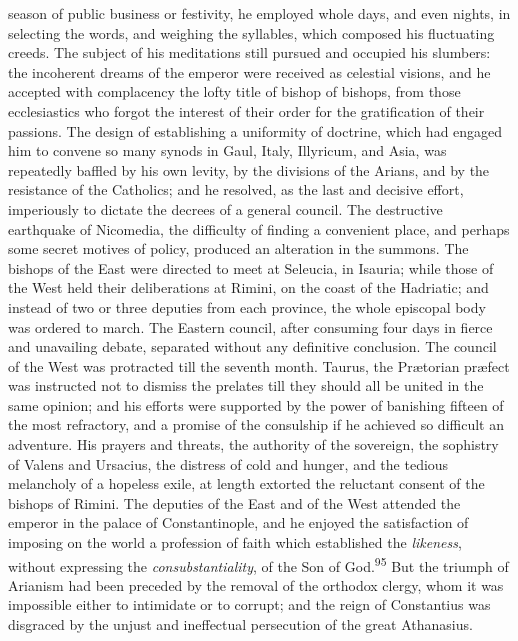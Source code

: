 season of public business or festivity, he employed whole days,
and even nights, in selecting the words, and weighing the
syllables, which composed his fluctuating creeds. The subject of
his meditations still pursued and occupied his slumbers: the
incoherent dreams of the emperor were received as celestial
visions, and he accepted with complacency the lofty title of
bishop of bishops, from those ecclesiastics who forgot the
interest of their order for the gratification of their passions.
The design of establishing a uniformity of doctrine, which had
engaged him to convene so many synods in Gaul, Italy, Illyricum,
and Asia, was repeatedly baffled by his own levity, by the
divisions of the Arians, and by the resistance of the Catholics;
and he resolved, as the last and decisive effort, imperiously to
dictate the decrees of a general council. The destructive
earthquake of Nicomedia, the difficulty of finding a convenient
place, and perhaps some secret motives of policy, produced an
alteration in the summons. The bishops of the East were directed
to meet at Seleucia, in Isauria; while those of the West held
their deliberations at Rimini, on the coast of the Hadriatic; and
instead of two or three deputies from each province, the whole
episcopal body was ordered to march. The Eastern council, after
consuming four days in fierce and unavailing debate, separated
without any definitive conclusion. The council of the West was
protracted till the seventh month. Taurus, the Prætorian præfect
was instructed not to dismiss the prelates till they should all
be united in the same opinion; and his efforts were supported by
the power of banishing fifteen of the most refractory, and a
promise of the consulship if he achieved so difficult an
adventure. His prayers and threats, the authority of the
sovereign, the sophistry of Valens and Ursacius, the distress of
cold and hunger, and the tedious melancholy of a hopeless exile,
at length extorted the reluctant consent of the bishops of
Rimini. The deputies of the East and of the West attended the
emperor in the palace of Constantinople, and he enjoyed the
satisfaction of imposing on the world a profession of faith which
established the \textit{likeness}, without expressing the
\textit{consubstantiality}, of the Son of God.\textsuperscript{95} But the triumph of
Arianism had been preceded by the removal of the orthodox clergy,
whom it was impossible either to intimidate or to corrupt; and
the reign of Constantius was disgraced by the unjust and
ineffectual persecution of the great Athanasius.

